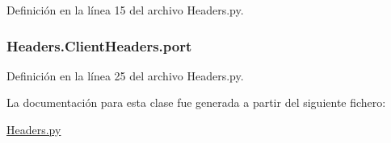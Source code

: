 Definición en la línea 15 del archivo Headers.\-py.

\hypertarget{class_headers_1_1_client_headers_af5c53154eabf8999c0445d47c2ec2e93}{
\subsubsection[{port}]{\setlength{\rightskip}{0pt plus 5cm}Headers.\-Client\-Headers.\-port}}\label{class_headers_1_1_client_headers_af5c53154eabf8999c0445d47c2ec2e93}


Definición en la línea 25 del archivo Headers.\-py.



La documentación para esta clase fue generada a partir del siguiente fichero\-:\begin{DoxyCompactItemize}
\item 
\hyperlink{_headers_8py}{Headers.\-py}\end{DoxyCompactItemize}
